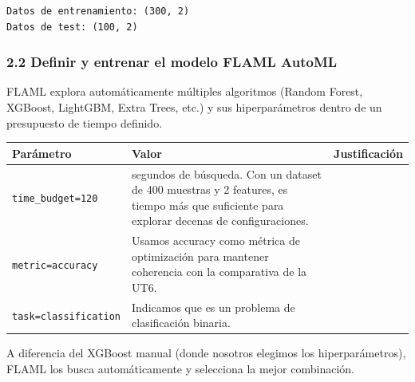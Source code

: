 \documentclass[11pt]{article}
\begin{document}
    \begin{Verbatim}[commandchars=\\\{\}]
Datos de entrenamiento: (300, 2)
Datos de test: (100, 2)
    \end{Verbatim}

    \subsubsection{2.2 Definir y entrenar el modelo FLAML
AutoML}\label{definir-y-entrenar-el-modelo-flaml-automl}

FLAML explora automáticamente múltiples algoritmos (Random Forest,
XGBoost, LightGBM, Extra Trees, etc.) y sus hiperparámetros dentro de un
presupuesto de tiempo definido.

{\def\LTcaptype{none} %
\begin{longtable}[]{@{}
  >{\raggedright\arraybackslash}p{}
  >{\raggedright\arraybackslash}p{}
  >{\raggedright\arraybackslash}p{}@{}}
\toprule\noalign{}
\begin{minipage}[b]{\linewidth}\raggedright
Parámetro
\end{minipage} & \begin{minipage}[b]{\linewidth}\raggedright
Valor
\end{minipage} & \begin{minipage}[b]{\linewidth}\raggedright
Justificación
\end{minipage} \\
\midrule\noalign{}
\endhead
\bottomrule\noalign{}
\endlastfoot
\texttt{time\_budget=120} & 120 segundos de búsqueda. Con un dataset de
400 muestras y 2 features, es tiempo más que suficiente para explorar
decenas de configuraciones. & \\
\texttt{metric=\textquotesingle{}accuracy\textquotesingle{}} & Usamos
accuracy como métrica de optimización para mantener coherencia con la
comparativa de la UT6. & \\
\texttt{task=\textquotesingle{}classification\textquotesingle{}} &
Indicamos que es un problema de clasificación binaria. & \\
\end{longtable}
}

A diferencia del XGBoost manual (donde nosotros elegimos los
hiperparámetros), FLAML los busca automáticamente y selecciona la mejor
combinación.
\end{document}
